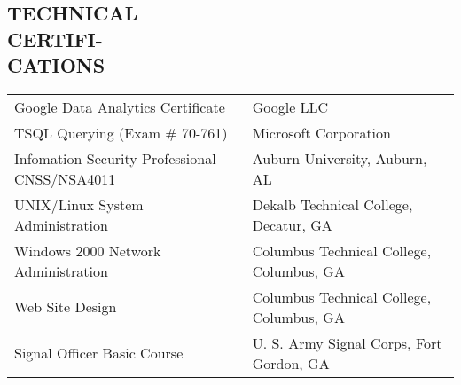 \documentclass[margin, 10pt]{res} %
\begin{document}
\begin{resume}

\section{TECHNICAL\\CERTIFI-\\CATIONS\\
}

\small
    \begin{tabular}{l l }
        Google Data Analytics Certificate & Google LLC\\
        TSQL Querying (Exam \# 70-761) & Microsoft Corporation\\
        Infomation Security Professional CNSS/NSA4011  & Auburn University, Auburn, AL\\
        UNIX/Linux System Administration  & Dekalb Technical College,  Decatur, GA\\
        Windows 2000 Network Administration  & Columbus Technical College, Columbus, GA\\
        Web Site Design  & Columbus Technical College, Columbus, GA\\
        Signal Officer Basic Course  & U. S. Army Signal Corps,  Fort Gordon, GA\\
    \end{tabular}
    \normalsize
%
%
%
%
%
%



\end{resume}
\end{document}
